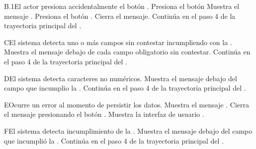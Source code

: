 \begin{UCtrayectoriaA}{B.1}{El actor presiona accidentalmente el botón .}
	\UCpaso[\UCactor] Presiona el botón 
	\UCpaso Muestra el mensaje .
	\UCpaso[\UCactor] Presiona el botón .
	\UCpaso Cierra el mensaje.
	\UCpaso Continúa en el paso 4 de la trayectoria principal del .
\end{UCtrayectoriaA}

\begin{UCtrayectoriaA}{C}{El sistema detecta uno o más campos sin contestar incumpliendo con la .}
	\UCpaso Muestra el mensaje debajo de cada campo obligatorio sin contestar.
	\UCpaso Continúa en el paso 4 de la trayectoria principal del .
\end{UCtrayectoriaA}

\begin{UCtrayectoriaA}{D}{El sistema detecta caracteres no numéricos.}
	\UCpaso Muestra el mensaje  debajo del campo que incumplio la .
	\UCpaso Continúa en el paso 4 de la trayectoria principal del .
\end{UCtrayectoriaA}

\begin{UCtrayectoriaA}{E}{Ocurre un error al momento de persistir los datos.}
	\UCpaso Muestra el mensaje .
    \UCpaso[\UCactor] Cierra el mensaje presionando el botón .
	\UCpaso Muestra la interfaz de usuario .
\end{UCtrayectoriaA}


\begin{UCtrayectoriaA}{F}{El sistema detecta incumplimiento de la .}
	\UCpaso Muestra el mensaje  debajo del campo que incumplió la .
	\UCpaso Continúa en el paso 4 de la trayectoria principal del .
\end{UCtrayectoriaA}